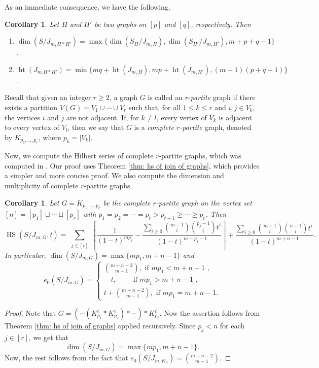 \documentclass[12pt,reqno]{amsart}
\newcommand \hs{\operatorname{HS}}
\DeclareMathOperator{\height}{ht}
\theoremstyle{plain}
\newtheorem{corollary}[theorem]{Corollary}
\theoremstyle{definition}
\begin{document}
 As an immediate consequence, we have the following.
 \begin{corollary}\label{cor: dim of join of graphs}
    Let $H$ and $H'$ be two graphs on $[p]$ and $[q]$, respectively. Then 
    \begin{enumerate}
        \item $\dim(S/J_{m,H*H'})=\max\{\dim(S_H/J_{m,H}),\dim(S_{H'}/J_{m,H'}),m+p+q-1\}$.
        \item $\height(J_{m.H*H'})=\min\{mq+\height(J_{m,H}),mp+\height(J_{m,H'}),(m-1)(p+q-1)\}$.
    \end{enumerate}
\end{corollary} 
Recall that given an integer $r\geq 2$, a graph \(G\) is called an \(r\)-\emph{partite} graph if there exists a partition \(V(G)=V_1\cup\cdots\cup V_r\) such that, for all \(1\leq k\leq r\) and \(i,j\in V_k\), the vertices \(i\) and \(j\) are not adjacent. If, for \(k\neq l\), every vertex of \(V_k\) is adjacent to every vertex of \(V_l\), then we say that \(G\) is a \emph{complete \(r\)-partite} graph, denoted by \(K_{p_1,\ldots,p_r}\), where \(p_k=|V_k|\).
\vspace{2mm}

Now, we compute the Hilbert series of complete $r$-partite graphs, which was computed in \cite{shen-Zhu-2023-GBEI-of-complete-r-partite-graphs}. Our proof uses Theorem \ref{thm: hs of join of graphs}, which provides a simpler and more concise proof. We also compute the dimension and multiplicity of complete $r$-partite graphs.
\begin{corollary}
    Let $G=K_{p_1,\ldots,p_r}$ be the complete $r$-partite graph on the vertex set $[n]=[p_1]\sqcup \cdots\sqcup [p_r]$ with $p_1=p_2=\cdots =p_t>p_{t+1}\geq \cdots\geq p_r$. Then
    $$\hs(S/J_{m,G},t)=\sum_{\substack{j\in[r]}}\left[\frac{1}{(1-t)^{mp_j}}-\frac{\sum_{i\geq 0}\binom{m-1}{i}\binom{p_j-1}{i}t^i}{(1-t)^{m+p_j-1}}\right]+\frac{\sum_{i\geq0}\binom{m-1}{i}\binom{n-1}{i}t^i}{(1-t)^{m+n-1}}.$$ In particular, $\dim(S/J_{m,G})=\max\{mp_1,m+n-1\}$ and 
    $$e_0({S/J_{m,G}})=\begin{cases}
        \binom{m+n-2}{m-1}, \text{ if $mp_1<m+n-1$ ,}\\
       \quad t, \quad\quad\text{ if $mp_1>m+n-1$ ,}\\
        t+\binom{m+n-2}{m-1},\text{ if $mp_1=m+n-1$.}
    \end{cases}$$
\end{corollary}
\begin{proof}
    Note that $G=(\cdots(K_{p_1}^c*K_{p_2}^c)*\cdots)*K_{p_r}^c$. Now the assertion follows from Theorem \ref{thm: hs of join of graphs} applied recursively. Since $p_j<n$ for each $j\in[r]$, we get that $$\dim(S/J_{m,G})=\max\{mp_1,m+n-1\}.$$ Now, the rest follows from the fact that $e_0(S/J_{m,K_n})=\binom{m+n-2}{m-1}$.
\end{proof}
\end{document}
